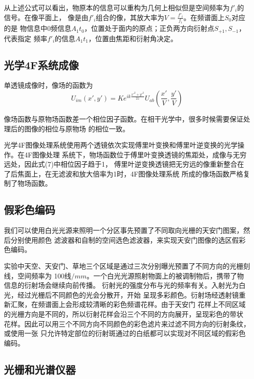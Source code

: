 \documentclass[12pt,a4paper]{article}
\begin{document}
    从上述公式可以看出，物原本的信息可以重构为几何上相似但是空间频率为${f'_i}$的信号。在像平面上，
    像是由${f'_i}$组合的像，其放大率为$V=\frac{{{{f'}_i}}}{{{f_i}}}$。在频谱面上$S_0$对应的是
    物信息中0频信息$A_1t_0$，位置处于面内的原点；正负两方向衍射点$S_{+1},S_{-1}$，代表指定
    频率${f'}_i$的信息$A_1t_1$，位置由焦距和衍射角决定。

    \subsection{光学4F系统成像}
    单透镜成像时，像场的函数为
    \begin{equation}
        {U_{im}}\left( {x',y'} \right) = K{e^{ik\frac{{{{x'}^2} + {{y'}^2}}}{{2z}}}}{U_{ab}}\left( {\frac{{x'}}{V},\frac{{y'}}{V}} \right)
    \end{equation}
    
    像场函数与原物场函数差一个相位因子函数。在相干光学中，很多时候需要保证处理后的图像的相位与原物场
    的相位一致。

    光学4F图像处理系统使用两个透镜依次实现傅里叶变换和傅里叶逆变换的光学操作。在4F图像处理
    系统下，物场函数位于傅里叶变换透镜的焦距处，成像与无穷远处，因此式(7)中相位因子趋于1，
    傅里叶逆变换透镜把无穷远的像重新整合在了后焦面上，在无滤波和放大倍率为1时，4F图像处理系统
    所成的像场函数严格复制了物场函数。

    \subsection{假彩色编码}
    我们可以使用白光光源来照明一个分区事先预置了不同取向光栅的天安门图案，然后分别使用颜色
    滤波器和自制的空间选色滤波器，来实现天安门图像的选区假彩色编码。

    实验中天空、天安门、草地三个区域是通过三次分别曝光预置了不同方向的光栅刻线，空间频率为
    100线$/mm$。一个白光光源照射物面上的被调制物后，携带了物信息的衍射场会继续向前传播。
    衍射光的强度分布与光的频率有关。入射光为白光，经过光栅后不同颜色的光会分散开，开始
    呈现多彩颜色。衍射场经透射镜重新汇聚，在频谱面上会形成较清晰的彩色频谱花样。由于天安门
    花样上不同区域的光栅方向是不同的，所以衍射花样会沿三个不同的方向展开，呈现彩色的带状
    花样。因此可以用三个不同方向不同颜色的彩色滤片来过滤不同方向的衍射条纹，或使用一张
    只允许特定部位的衍射斑通过的白纸都可以实现对不同区域的假彩色编码。

    \subsection{光栅和光谱仪器}
\end{document}
